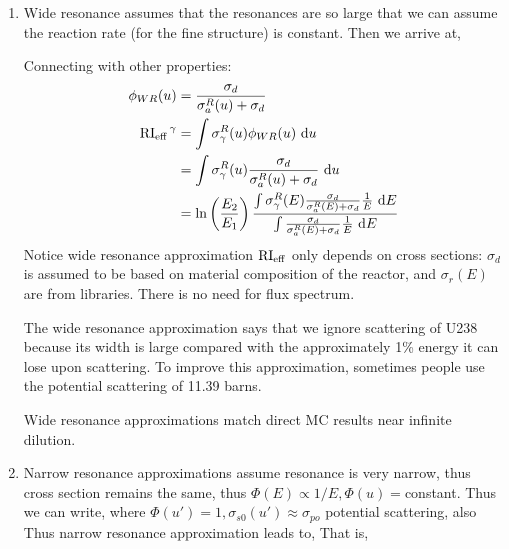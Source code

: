 \documentclass{school-22.211-notes}
\begin{document}
\begin{enumerate}
\item Wide resonance assumes that the resonances are so large that we can assume the reaction rate (for the fine structure) is constant. 
Then we arrive at, 
%


Connecting with other properties:
\begin{align}
\phi_{WR} (u) &= \frac{\sigma_d}{\sigma_{a}^R (u) +  \sigma_d } \\
\left. \mathrm{RI}_{\mathrm{eff}} \right.^{\gamma} &= \int \sigma_{\gamma}^R (u) \phi_{WR} (u) \mbox{ }\mathrm{d} u \\
&= \int \sigma_{\gamma}^R (u) \frac{\sigma_d}{\sigma_a^R(u) + \sigma_d} \mbox{ }\mathrm{d} u \\
&= \ln\left( \frac{E_2}{E_1} \right) \frac{ \int \sigma_{\gamma}^R (E) \frac{\sigma_d}{\sigma_{a}^R(E) + \sigma_d} \frac{1}{E} \mbox{ }\mathrm{d} E}{ \int \frac{\sigma_d}{\sigma_{a}^R(E) + \sigma_d} \frac{1}{E} \mbox{ }\mathrm{d} E}
\end{align}
Notice wide resonance approximation $\mathrm{RI}_{\mathrm{eff}}$ only depends on cross sections: $\sigma_d$ is assumed to be based on material composition of the reactor, and $\sigma_r(E)$ are from libraries. There is no need for flux spectrum. 

The wide resonance approximation says that we ignore scattering of U238 because its width is large compared with the approximately 1\% energy it can lose upon scattering. To improve this approximation, sometimes people use the potential scattering of 11.39 barns. 

Wide resonance approximations match direct MC results near infinite dilution. 




\item Narrow resonance approximations assume resonance is very narrow, thus cross section remains the same, thus $\Phi(E) \propto 1/E, \Phi(u) = $constant. Thus we can write, 
where $\Phi(u') = 1, \sigma_{s0} (u')\approx \sigma_{po}$ potential scattering, also 
Thus narrow resonance approximation leads to, 
That is, 





\end{enumerate}
\end{document}
